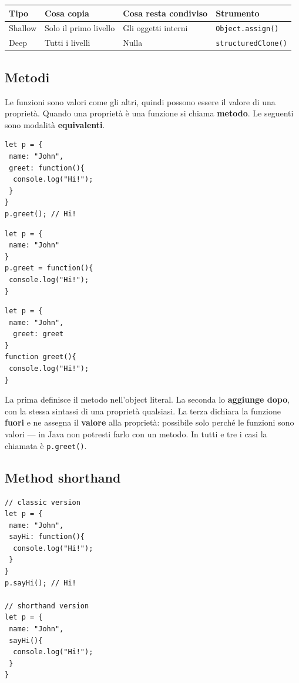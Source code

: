\documentclass[10pt,a4paper]{article}
\begin{document}
\begin{center}
\small
\begin{tabularx}{\textwidth}{@{}lXXX@{}}
\toprule
\textbf{Tipo} & \textbf{Cosa copia} & \textbf{Cosa resta condiviso} & \textbf{Strumento} \\
\midrule
Shallow & Solo il primo livello & Gli oggetti interni & \texttt{Object.assign()} \\
Deep & Tutti i livelli & Nulla & \texttt{structuredClone()} \\
\bottomrule
\end{tabularx}
\end{center}

\subsection{Metodi}

Le funzioni sono valori come gli altri, quindi possono essere il valore di una proprietà. Quando una proprietà è una funzione si chiama \textbf{metodo}. Le seguenti sono modalità \textbf{equivalenti}.

\begin{lstlisting}[style=js]
let p = {
 name: "John",
 greet: function(){
  console.log("Hi!");
 }
}
p.greet(); // Hi!
\end{lstlisting}

\begin{lstlisting}[style=js]
let p = {
 name: "John"
}
p.greet = function(){
 console.log("Hi!");
}
\end{lstlisting}

\begin{lstlisting}[style=js]
let p = {
 name: "John",
  greet: greet
}
function greet(){
 console.log("Hi!");
}
\end{lstlisting}

La prima definisce il metodo nell'object literal. La seconda lo \textbf{aggiunge dopo}, con la stessa sintassi di una proprietà qualsiasi. La terza dichiara la funzione \textbf{fuori} e ne assegna il \textbf{valore} alla proprietà: possibile solo perché le funzioni sono valori --- in Java non potresti farlo con un metodo. In tutti e tre i casi la chiamata è \texttt{p.greet()}.

\subsection{Method shorthand}

\begin{lstlisting}[style=js]
// classic version
let p = {
 name: "John",
 sayHi: function(){
  console.log("Hi!");
 }
}
p.sayHi(); // Hi!

// shorthand version
let p = {
 name: "John",
 sayHi(){
  console.log("Hi!");
 }
}
\end{lstlisting}
\end{document}
